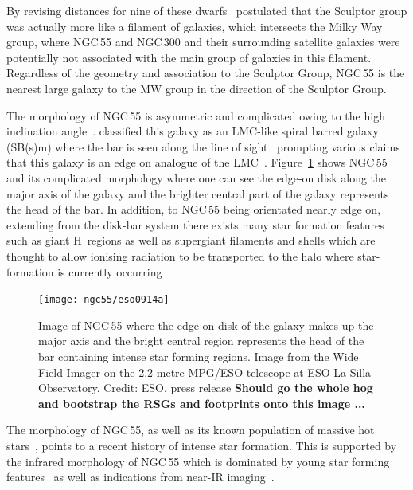 By revising distances for nine of these dwarfs~\cite{2003A&A...404...93K} postulated that the Sculptor group was actually more like a filament of galaxies, which intersects the Milky Way group, where NGC\,55 and NGC\,300 and their surrounding satellite galaxies were potentially not associated with the main group of galaxies in this filament.
Regardless of the geometry and association to the Sculptor Group, NGC\,55 is the nearest large galaxy to the MW group in the direction of the Sculptor Group.

The morphology of NGC\,55 is asymmetric and complicated owing to the high inclination angle~\cite[up to 80\textdegree;][]{1986A&A...166...97H,2013MNRAS.434.3511W}.
\cite{1961ApJ...133..405D} classified this galaxy as an LMC-like spiral barred galaxy (SB(s)m) where the bar is seen along the line of sight~\cite{1961ApJ...133..405D}
prompting various claims that this galaxy is an edge on analogue of the LMC~\citep[e.g.][although not cited heavily -- two citations in 50 years -- the idea has propagated]{1964IAUS...20..276R}.
Figure~\ref{fig:ngc55-wide} shows NGC\,55 and its complicated morphology where one can see the edge-on disk along the major axis of the galaxy and the brighter central part of the galaxy represents the head of the bar.
In addition, to NGC\,55 being orientated nearly edge on, extending from the disk-bar system there exists many star formation features such as giant H\,\2 regions as well as supergiant filaments and shells which are thought to allow ionising radiation to be transported to the halo where star-formation is currently occurring~\citep{1996AJ....112.2567F}.

\begin{figure}
 \centering
 \texttt{[image: ngc55/eso0914a]}
 \caption[Image of NGC\,55]{Image of NGC\,55 where the edge on disk of the galaxy makes up the major axis and the bright central region represents the head of the bar containing intense star forming regions.
 Image from the Wide Field Imager on the 2.2-metre MPG/ESO telescope at ESO La Silla Observatory. Credit: ESO, press release
 \textbf{Should go the whole hog and bootstrap the RSGs and footprints onto this image ...}}
 \label{fig:ngc55-wide}
\end{figure}


The morphology of NGC\,55, as well as its known population of massive hot stars~\citep{2008A&A...485...41C,2012A&A...542A..79C}, points to a recent history of intense star formation.
This is supported by the infrared morphology of NGC\,55 which is dominated by young star forming features~\citep[][with a star formation rate of 0.22\,M$_{\odot}$yr$^{-1}$]{2004ApJS..154..248E} as well as indications from near-IR imaging~\citep{2005ApJ...622..279D}.

